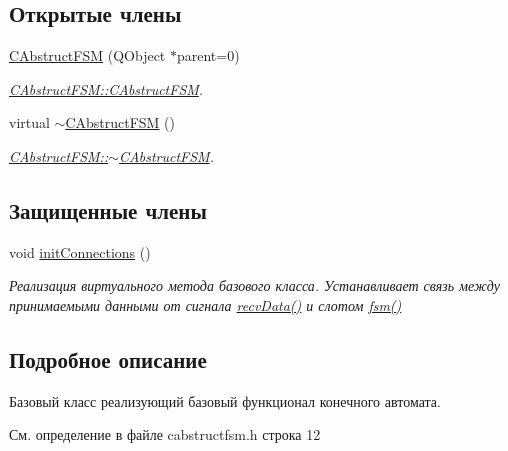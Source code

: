 \subsection*{Открытые члены}
\begin{DoxyCompactItemize}
\item 
\hyperlink{class_c_abstruct_f_s_m_a54037c986f6b437c50d5e8ba42063330}{C\+Abstruct\+F\+SM} (Q\+Object $\ast$parent=0)
\begin{DoxyCompactList}\small\item\em \hyperlink{class_c_abstruct_f_s_m_a54037c986f6b437c50d5e8ba42063330}{C\+Abstruct\+F\+S\+M\+::\+C\+Abstruct\+F\+SM}. \end{DoxyCompactList}\item 
virtual \hyperlink{class_c_abstruct_f_s_m_acef4a425dee5b9705bc6bbff79225bae}{$\sim$\+C\+Abstruct\+F\+SM} ()
\begin{DoxyCompactList}\small\item\em \hyperlink{class_c_abstruct_f_s_m_acef4a425dee5b9705bc6bbff79225bae}{C\+Abstruct\+F\+S\+M\+::$\sim$\+C\+Abstruct\+F\+SM}. \end{DoxyCompactList}\end{DoxyCompactItemize}
\subsection*{Защищенные члены}
\begin{DoxyCompactItemize}
\item 
void \hyperlink{class_c_abstruct_f_s_m_a9d6f4659a08f3028f8c047243f8dcfc3}{init\+Connections} ()
\begin{DoxyCompactList}\small\item\em Реализация виртуального метода базового класса. Устанавливает связь между принимаемыми данными от сигнала \hyperlink{class_c_abstruct_controller_item_a6898e48061cb0cac2065f8193bd386c1}{recv\+Data()} и слотом \hyperlink{class_c_abstruct_f_s_m_ae06497e1f93385cd6c20eaa84fc253c1}{fsm()} \end{DoxyCompactList}\end{DoxyCompactItemize}


\subsection{Подробное описание}
Базовый класс реализующий базовый функционал конечного автомата. 

См. определение в файле cabstructfsm.\+h строка 12



